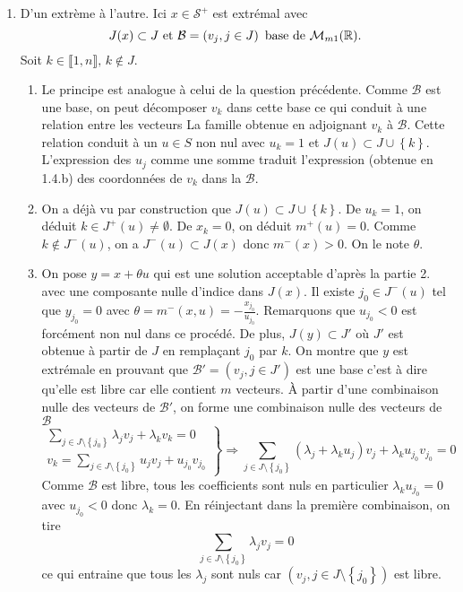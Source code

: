 \begin{enumerate}
  \item D'un extrème à l'autre.\newline
  Ici $x\in \mathcal{S}^+$ est extrémal avec 
\[
  J(x) \subset J \text{ et } \mathcal{B} = \left( v_j, j\in J\right) \text{ base de } \mathcal{M}_{m 1}(\mathbb{R}).
\] 
Soit $k \in \llbracket 1,n \rrbracket,\, k \notin J$.
\begin{enumerate}
  \item Le principe est analogue à celui de la question précédente. Comme $\mathcal{B}$ est une base, on peut décomposer $v_k$ dans cette base ce qui conduit à une relation entre les vecteurs La famille obtenue en adjoignant $v_k$ à $\mathcal{B}$. Cette relation conduit à un $u \in S$ non nul avec $u_k = 1$ et $J(u) \subset J\cup \left\lbrace k \right\rbrace$.\newline
  L'expression des $u_j$ comme une somme traduit l'expression (obtenue en 1.4.b) des coordonnées de $v_k$ dans la $\mathcal{B}$.
  
  \item On a déjà vu par construction que $J(u) \subset J\cup \left\lbrace k \right\rbrace$. De $u_k = 1$, on déduit $k\in J^+(u) \neq \emptyset$. De $x_k = 0$, on déduit $m^+(u) = 0$.\newline
Comme $k \notin J^-(u)$, on a $J^-(u) \subset J(x)$ donc $m^-(x) >0$. On le note $\theta$.  

  \item On pose $y = x + \theta u$ qui est une solution acceptable d'après la partie 2. avec une composante nulle d'indice dans $J(x)$.\newline
  Il existe $j_0 \in J^-(u)$ tel que $y_{j_0} = 0$ avec $\theta = m^-(x,u) = -\frac{x_{j_0}}{u_{j_0}}$. Remarquons que $u_{j_0} < 0$ est forcément non nul dans ce procédé.\newline
  De plus, $J(y) \subset J'$ où $J'$ est obtenue à partir de $J$ en remplaçant $j_0$ par $k$.\newline
  On montre que $y$ est extrémale en prouvant que $\mathcal{B}'= \left( v_j, j\in J'\right)$ est une base c'est à dire qu'elle est libre car elle contient $m$ vecteurs.\newline
  \`A partir d'une combinaison nulle des vecteurs de $\mathcal{B}'$, on forme une combinaison nulle des vecteurs de $\mathcal{B}$
\[
  \left.
\begin{aligned}
\sum_{j \in J\setminus\left\lbrace j_0 \right\rbrace}\lambda_j v_j + \lambda_{k}v_{k} = 0 \\
v_k = \sum_{j \in J\setminus\left\lbrace j_0 \right\rbrace}u_j v_j + u_{j_0}v_{j_0}
\end{aligned}
\right\rbrace
\Rightarrow
\sum_{j \in J\setminus\left\lbrace j_0 \right\rbrace}\left(\lambda_j +\lambda_k u_j\right)v_j + \lambda_k u_{j_0}v_{j_0} = 0
\]
Comme $\mathcal{B}$ est libre, tous les coefficients sont nuls en particulier $\lambda_k u_{j_0}= 0$ avec $u_{j_0} < 0$ donc $\lambda_k = 0$. En réinjectant dans la première combinaison, on tire
\[
\sum_{j \in J\setminus\left\lbrace j_0 \right\rbrace}\lambda_j v_j = 0
\]
 ce qui entraine que tous les $\lambda_j$ sont nuls car $\left(v_j, j \in J\setminus\left\lbrace j_0 \right\rbrace \right)$ est libre.
\end{enumerate}
  

\end{enumerate}
